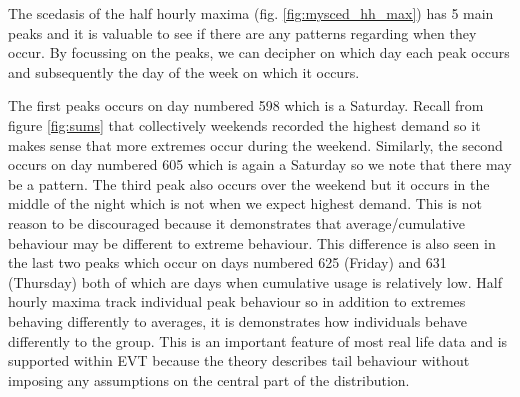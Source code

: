 The scedasis of the half hourly maxima (fig. \ref{fig:mysced_hh_max}) has 5 main peaks and it is valuable to see if there are any patterns regarding when they occur. By focussing on the peaks, we can decipher on which day each peak occurs and subsequently the day of the week on which it occurs.

The first peaks occurs on day numbered 598 which is a Saturday. Recall from figure \ref{fig:sums} that collectively weekends recorded the highest demand so it makes sense that more extremes occur during the weekend. Similarly, the second occurs on day numbered 605 which is again a Saturday so we note that there may be a pattern. The third peak also occurs over the weekend but it occurs in the middle of the night which is not when we expect highest demand. This is not reason to be discouraged because it demonstrates that average/cumulative behaviour may be different to extreme behaviour. This difference is also seen in the last two peaks which occur on days numbered 625 (Friday) and 631 (Thursday) both of which are days when cumulative usage is relatively low. Half hourly maxima track individual peak behaviour so in addition to extremes behaving differently to averages, it is demonstrates how individuals behave differently to the group. This is an important feature of most real life data and is supported within EVT because the theory describes tail behaviour without imposing any assumptions on the central part of the distribution.



